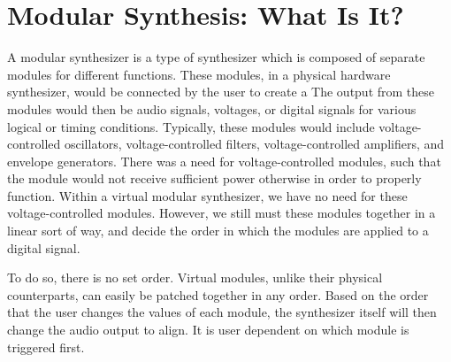 \section[Modular Synthesis: What Is It?]{Modular Synthesis: What Is It?}\label{section:modular-synth-what-is}

A modular synthesizer is a type of synthesizer which is composed of separate modules for different functions. These modules, in a physical hardware synthesizer, would be connected by the user to create a  The output from these modules would then be audio signals, voltages, or digital signals for various logical or timing conditions. Typically, these modules would include voltage-controlled oscillators, voltage-controlled filters, voltage-controlled amplifiers, and envelope generators. There was a need for voltage-controlled modules, such that the module would not receive sufficient power otherwise in order to properly function. Within a virtual modular synthesizer, we have no need for these voltage-controlled modules. However, we still must  these modules together in a linear sort of way, and decide the order in which the modules are applied to a digital signal. 

To do so, there is no set order. Virtual modules, unlike their physical counterparts, can easily be patched together in any order. Based on the order that the user changes the values of each module, the synthesizer itself will then change the audio output to align. It is user dependent on which module is triggered first.

